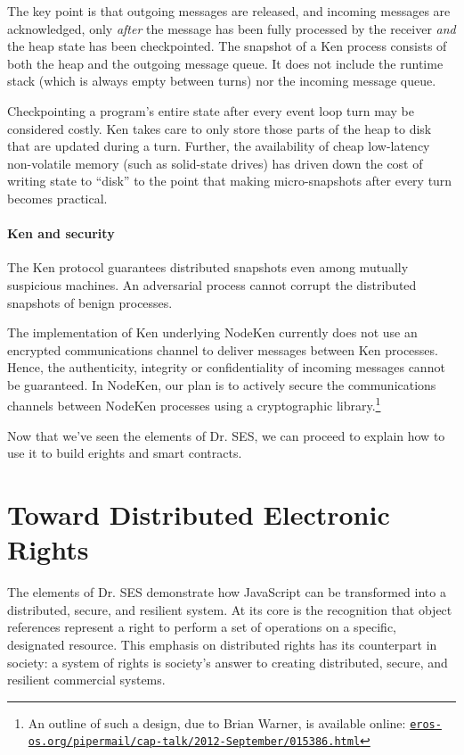 \documentclass{llncs}
\newcommand{\myurl}[1]{{\href{http://#1}{\texttt{#1}}}}
\begin{document}
The key point is that outgoing messages are released, and incoming messages are acknowledged, only \emph{after} the message has been fully processed by the receiver \emph{and} the heap state has been checkpointed. The snapshot of a Ken process consists of both the heap and the outgoing message queue. It does not include the runtime stack (which is always empty between turns) nor the incoming message queue.

Checkpointing a program's entire state after every event loop turn may be considered costly. Ken takes care to only store those parts of the heap to disk that are updated during a turn. Further, the availability of cheap low-latency non-volatile memory (such as solid-state drives) has driven down the cost of writing state to ``disk'' to the point that making micro-snapshots after every turn becomes practical.

\paragraph{Ken and security}

The Ken protocol guarantees distributed snapshots even among mutually suspicious machines. An adversarial process cannot corrupt the distributed snapshots of benign processes.

The implementation of Ken underlying NodeKen currently does not use an encrypted communications channel to deliver messages between Ken processes. Hence, the authenticity, integrity or confidentiality of incoming messages cannot be guaranteed. In NodeKen, our plan is to actively secure the communications channels between NodeKen processes using a cryptographic library.\footnote{
%
An outline of such a design, due to Brian Warner, is available online: \myurl{eros-os.org/pipermail/cap-talk/2012-September/015386.html}}

Now that we've seen the elements of Dr. SES, we can proceed to explain how to use it to build erights and smart contracts.

\section{Toward Distributed Electronic Rights}
\label{towarderights}

The elements of Dr. SES demonstrate how JavaScript can be transformed into a distributed, secure, and resilient system. At its core is the recognition that object references represent a right to perform a set of operations on a specific, designated resource. This emphasis on distributed rights has its counterpart in society: a system of rights is society's answer to creating distributed, secure, and resilient commercial systems.
\end{document}
